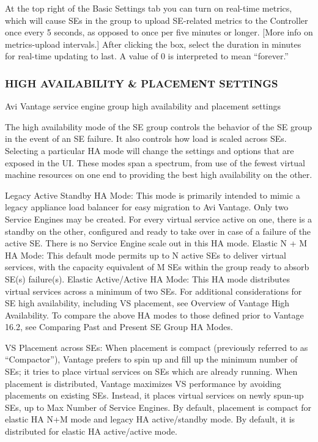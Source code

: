 \documentclass[letterpaper,10pt,english]{sphinxmanual}
\begin{document}
At the top right of the Basic Settings tab you can turn on real-time metrics, which will cause SEs in the group to upload SE-related metrics to the Controller once every 5 seconds, as opposed to once per five minutes or longer. {[}More info on metrics-upload intervals.{]} After clicking the box, select the duration in minutes for real-time updating to last. A value of 0 is interpreted to mean ``forever.''


\subsubsection{HIGH AVAILABILITY \& PLACEMENT SETTINGS}
\label{\detokenize{getting_started/service_engine_group:high-availability-placement-settings}}
Avi Vantage service engine group high availability and placement settings

The high availability mode of the SE group controls the behavior of the SE group in the event of an SE failure.  It also controls how load is scaled across SEs. Selecting a particular HA mode will change the settings and options that are exposed in the UI. These modes span a spectrum, from use of the fewest virtual machine resources on one end to providing the best high availability on the other.

Legacy Active Standby HA Mode:  This mode is primarily intended to mimic a legacy appliance load balancer for easy migration to Avi Vantage.  Only two Service Engines may be created.  For every virtual service active on one, there is a standby on the other, configured and ready to take over in case of a failure of the active SE.  There is no Service Engine scale out in this HA mode.
Elastic N + M HA Mode:  This default mode permits up to N active SEs to deliver virtual services, with the capacity equivalent of M SEs within the group ready to absorb SE(s) failure(s).
Elastic Active/Active HA Mode:  This HA mode distributes virtual services across a minimum of two SEs.
For additional considerations for SE high availability, including VS placement, see Overview of Vantage High Availability. To compare the above HA modes to those defined prior to Vantage 16.2, see Comparing Past and Present SE Group HA Modes.

VS Placement across SEs: When placement is compact (previously referred to as ``Compactor''), Vantage prefers to spin up and fill up the minimum number of SEs; it tries to place virtual services on SEs which are already running. When placement is distributed, Vantage maximizes VS performance by avoiding placements on existing SEs. Instead, it places virtual services on newly spun-up SEs, up to Max Number of Service Engines. By default, placement is compact for elastic HA N+M mode and legacy HA active/standby mode. By default, it is distributed for elastic HA active/active mode.
\end{document}
